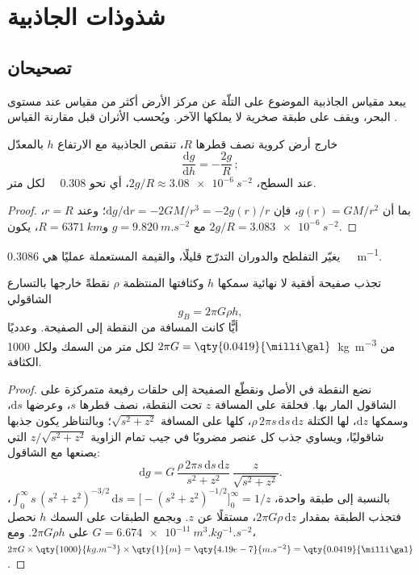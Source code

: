 \section{شذوذات الجاذبية}

\subsection*{تصحيحان}

يبعد مقياس الجاذبية الموضوع على التلّة عن مركز الأرض أكثر من مقياس عند مستوى البحر، ويقف على طبقة صخرية لا يملكها الآخر. ويُحسب الأثران قبل مقارنة القياس .

\begin{proposition}\label{prop:b1:isostasy-gravity:free-air}
خارج أرض كروية نصف قطرها $R$، تنقص الجاذبية مع الارتفاع $h$ بالمعدّل
\[
  \frac{\mathrm dg}{\mathrm dh} = -\frac{2g}{R}\,;
\]
عند السطح، $2g/R \approx \qty{3.08e-6}{s^{-2}}$، أي نحو \qty{0.308}{\milli\gal} لكل متر.
\end{proposition}

\begin{proof}
بما أن $g(r) = GM/r^2$، فإن $\mathrm dg/\mathrm dr = -2GM/r^3 = -2g(r)/r$؛ وعند $r = R$، مع $g = \qty{9.820}{m.s^{-2}}$ و$R = \qty{6371}{km}$، يكون $2g/R =
\qty{3.083e-6}{s^{-2}}$.
\end{proof}

يغيّر التفلطح والدوران التدرّج قليلًا، والقيمة المستعملة عمليًا هي \qty{0.3086}{\milli\gal.m^{-1}}.

\begin{proposition}\label{prop:b1:isostasy-gravity:slab}
تجذب صفيحة أفقية لا نهائية سمكها $h$ وكثافتها المنتظمة $\rho$ نقطةً خارجها بالتسارع الشاقولي
\[
  g_B = 2\pi G\rho h ,
\]
أيًّا كانت المسافة من النقطة إلى الصفيحة. وعدديًا $2\pi G =
\qty{0.0419}{\milli\gal}$ لكل متر من السمك ولكل \qty{1000}{kg.m^{-3}} من الكثافة.
\end{proposition}

\begin{proof}
نضع النقطة في الأصل ونقطّع الصفيحة إلى حلقات رفيعة متمركزة على الشاقول المار بها. فحلقة على المسافة $z$ تحت النقطة، نصف قطرها $s$، وعرضها $\mathrm ds$، وسمكها $\mathrm dz$، لها الكتلة $\rho\,2\pi s\,\mathrm ds\,\mathrm dz$، كلها على المسافة $\sqrt{s^2 + z^2}$؛ وبالتناظر يكون جذبها شاقوليًا، ويساوي جذب كل عنصر مضروبًا في جيب تمام الزاوية $z/\sqrt{s^2+z^2}$ التي يصنعها مع الشاقول:
\[
  \mathrm dg = G\,\frac{\rho\,2\pi s\,\mathrm ds\,\mathrm dz}{s^2 + z^2}\,
  \frac{z}{\sqrt{s^2 + z^2}} .
\]
بالنسبة إلى طبقة واحدة، $\int_0^\infty s\,(s^2 + z^2)^{-3/2}\,\mathrm ds =
\bigl[-(s^2 + z^2)^{-1/2}\bigr]_0^\infty = 1/z$، فتجذب الطبقة بمقدار
$2\pi G\rho\,\mathrm dz$، مستقلًا عن $z$. وبجمع الطبقات على السمك $h$ نحصل على $2\pi G\rho h$. ومع $G = \qty{6.674e-11}{m^3.kg^{-1}.s^{-2}}$،
$2\pi G\times\qty{1000}{kg.m^{-3}}\times\qty{1}{m} = \qty{4.19e-7}{m.s^{-2}} =
\qty{0.0419}{\milli\gal}$.
\end{proof}

